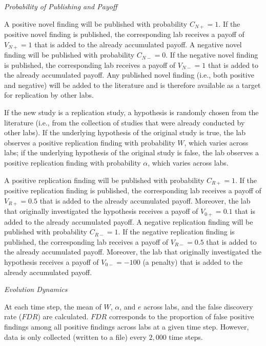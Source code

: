 \documentclass[meta, authordate]{jote-new-article}
\begin{document}
\begin{adjustwidth}{-4cm}{}
\begin{tcolorbox}
{      \vspace*{\baselineskip}
      \noindent\emph{Probability of Publishing and Payoff}
      \vspace*{\baselineskip}

      \noindent A positive novel finding will be published with probability $C_{N+}=1$. If the positive novel finding is published, the corresponding lab receives a payoff of $V_{N+}=1$ that is added to the already accumulated payoff. A negative novel finding will be published with probability $C_{N-}=0$. If the negative novel finding is published, the corresponding lab receives a payoff of $V_{N-}=1$ that is added to the already accumulated payoff. Any published novel finding (i.e., both positive and negative) will be added to the literature and is therefore available as a target for replication by other labs.

      If the new study is a replication study, a hypothesis is randomly chosen from the literature (i.e., from the collection of studies that were already conducted by other labs). If the underlying hypothesis of the original study is true, the lab observes a positive replication finding with probability $W$, which varies across labs; if the underlying hypothesis of the original study is false, the lab observes a positive replication finding with probability $\alpha$, which varies across labs.

      A positive replication finding will be published with probability $C_{R+}=1$. If the positive replication finding is published, the corresponding lab receives a payoff of $V_{R+}=0.5$ that is added to the already accumulated payoff. Moreover, the lab that originally investigated the hypothesis receives a payoff of $V_{0+}=0.1$ that is added to the already accumulated payoff. A negative replication finding will be published with probability $C_{R-}=1$. If the negative replication finding is published, the corresponding lab receives a payoff of $V_{R-}=0.5$ that is added to the already accumulated payoff. Moreover, the lab that originally investigated the hypothesis receives a payoff of $V_{0-}=-100$ (a penalty) that is added to the already accumulated payoff.

      \vspace*{\baselineskip}
      \noindent\emph{Evolution Dynamics}
      \vspace*{\baselineskip}

      \noindent At each time step, the mean of $W$, $\alpha$, and $e$ across labs, and the false discovery rate ($FDR$) are calculated. $FDR$ corresponds to the proportion of false positive findings among all positive findings across labs at a given time step. However, data is only collected (written to a file) every $2,000$ time steps.

}
\end{tcolorbox}
\end{adjustwidth}
\end{document}
